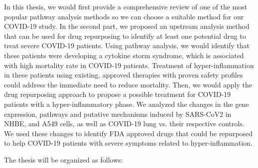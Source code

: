 %

%

In this thesis, we would first provide a comprehensive review of one of the most popular pathway analysis methods so we can choose a suitable method for our COVID-19 study. In the second part, we proposed an upstream analysis method that can be used for drug repurposing to identify at least one potential drug to treat severe COVID-19 patients. 
Using pathway analysis, we would identify that these patients were developing a cytokine storm syndrome, which is associated with high mortality rate in COVID-19 patients. Treatment of hyper-inflammation in these patients using existing, approved therapies with proven safety profiles could address the immediate need to reduce mortality. 
Then, we would apply the drug repurposing approach to propose a possible treatment for COVID-19 patients with a hyper-inflammatory phase. 
We analyzed  the changes in the gene expression, pathways and putative mechanisms induced by SARS-CoV2 in  NHBE, and A549 cells, as well as COVID-19 lung vs. their respective controls. We used these  changes to identify FDA approved drugs that could be repurposed to help COVID-19 patients with severe symptoms related to hyper-inflammation. 

The thesis will be organized as follows:

